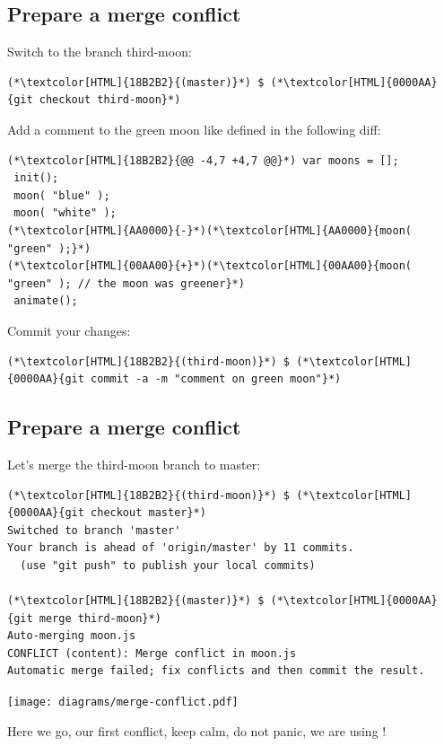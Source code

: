 \subsection{Prepare a merge conflict}
\begin{frame}[fragile]
  \subslidetitle

  Switch to the branch third-moon:
  \begin{lstlisting}
(*\textcolor[HTML]{18B2B2}{(master)}*) $ (*\textcolor[HTML]{0000AA}{git checkout third-moon}*)
\end{lstlisting}

  Add a comment to the green moon like defined in the following diff:
  \begin{lstlisting}
(*\textcolor[HTML]{18B2B2}{@@ -4,7 +4,7 @@}*) var moons = [];
 init();
 moon( "blue" );
 moon( "white" );
(*\textcolor[HTML]{AA0000}{-}*)(*\textcolor[HTML]{AA0000}{moon( "green" );}*)
(*\textcolor[HTML]{00AA00}{+}*)(*\textcolor[HTML]{00AA00}{moon( "green" ); // the moon was greener}*)
 animate();
\end{lstlisting}

  Commit your changes:
  \begin{lstlisting}
(*\textcolor[HTML]{18B2B2}{(third-moon)}*) $ (*\textcolor[HTML]{0000AA}{git commit -a -m "comment on green moon"}*)
\end{lstlisting}
\end{frame}

\subsection{Prepare a merge conflict}
\begin{frame}[fragile]
  \subslidetitle

  Let's merge the third-moon branch to master:
  \begin{lstlisting}
(*\textcolor[HTML]{18B2B2}{(third-moon)}*) $ (*\textcolor[HTML]{0000AA}{git checkout master}*)
Switched to branch 'master'
Your branch is ahead of 'origin/master' by 11 commits.
  (use "git push" to publish your local commits)

(*\textcolor[HTML]{18B2B2}{(master)}*) $ (*\textcolor[HTML]{0000AA}{git merge third-moon}*)
Auto-merging moon.js
CONFLICT (content): Merge conflict in moon.js
Automatic merge failed; fix conflicts and then commit the result.
\end{lstlisting}
  \centerline{\texttt{[image: diagrams/merge-conflict.pdf]}}
  \vspace{0.5em}
  Here we go, our first conflict, keep calm, do not panic, we are using !
\end{frame}

